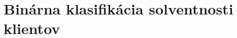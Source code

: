 \documentclass[report.tex]{subfiles}
\begin{document}
\section{Binárna klasifikácia solventnosti klientov}\label{sec:G}
\end{document}
